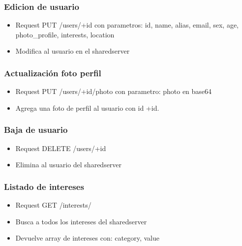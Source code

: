 \documentclass[letterpaper,10pt,english]{sphinxmanual}
\begin{document}
\subsubsection{Edicion de usuario}
\label{manuals:edicion-de-usuario}\begin{itemize}
\item {} 
Request PUT /users/+id con parametros: id, name, alias, email, sex, age, photo\_profile, interests, location

\item {} 
Modifica al usuario  en el sharedserver

\end{itemize}


\subsubsection{Actualización foto perfil}
\label{manuals:actualizacion-foto-perfil}\begin{itemize}
\item {} 
Request PUT /users/+id/photo con parametro: photo en base64

\item {} 
Agrega una foto de perfil al usuario con id +id.

\end{itemize}


\subsubsection{Baja de usuario}
\label{manuals:baja-de-usuario}\begin{itemize}
\item {} 
Request DELETE /users/+id

\item {} 
Elimina al usuario del sharedserver

\end{itemize}


\subsubsection{Listado de intereses}
\label{manuals:listado-de-intereses}\begin{itemize}
\item {} 
Request GET /interests/

\item {} 
Busca a todos los intereses del sharedserver

\item {} 
Devuelve array de intereses con: category, value

\end{itemize}
\end{document}
